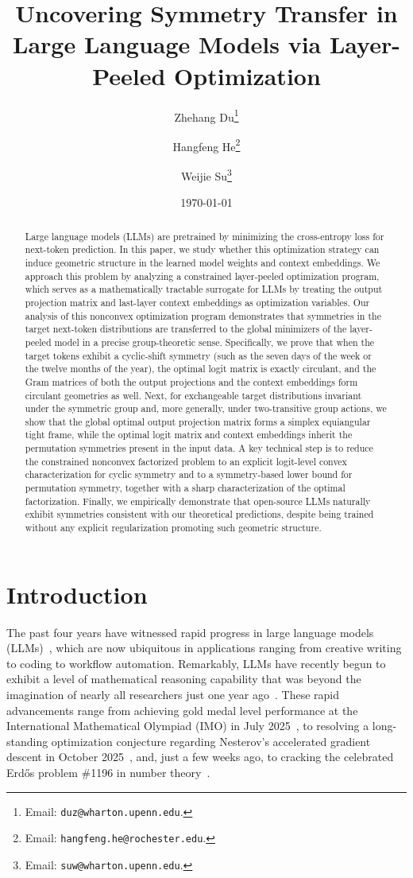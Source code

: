 \documentclass[11pt]{article}
\title{Uncovering Symmetry Transfer in Large Language Models via Layer-Peeled Optimization}
\author[1]{Zhehang Du\thanks{Email: \texttt{duz@wharton.upenn.edu}.}}
\author[2]{Hangfeng He\thanks{Email: \texttt{hangfeng.he@rochester.edu}.}}
\author[1]{Weijie Su\thanks{Email: \texttt{suw@wharton.upenn.edu}.}}
\affil[1]{The Wharton School, University of Pennsylvania}
\affil[2]{University of Rochester}
\date\today
\begin{document}
\maketitle

\begin{abstract}
Large language models (LLMs) are pretrained by minimizing the cross-entropy loss for next-token prediction. In this paper, we study whether this optimization strategy can induce geometric structure in the learned model weights and context embeddings. We approach this problem by analyzing a constrained layer-peeled optimization program, which serves as a mathematically tractable surrogate for LLMs by treating the output projection matrix and last-layer context embeddings as optimization variables. Our analysis of this nonconvex optimization program demonstrates that symmetries in the target next-token distributions are transferred to the global minimizers of the layer-peeled model in a precise group-theoretic sense. Specifically, we prove that when the target tokens exhibit a cyclic-shift symmetry (such as the seven days of the week or the twelve months of the year), the optimal logit matrix is exactly circulant, and the Gram matrices of both the output projections and the context embeddings form circulant geometries as well. Next, for exchangeable target distributions invariant under the symmetric group and, more generally, under two-transitive group actions, we show that the global optimal output projection matrix forms a simplex equiangular tight frame, while the optimal logit matrix and context embeddings inherit the permutation symmetries present in the input data. A key technical step is to reduce the constrained nonconvex factorized problem to an explicit logit-level convex characterization for cyclic symmetry and to a symmetry-based lower bound for permutation symmetry, together with a sharp characterization of the optimal factorization. Finally, we empirically demonstrate that open-source LLMs naturally exhibit symmetries consistent with our theoretical predictions, despite being trained without any explicit regularization promoting such geometric structure.
\end{abstract}

\section{Introduction}

The past four years have witnessed rapid progress in large language models (LLMs)~\citep{brown2020language,achiam2023gpt4}, which are now ubiquitous in applications ranging from creative writing to coding to workflow automation. Remarkably, LLMs have recently begun to exhibit a level of mathematical reasoning capability that was beyond the imagination of nearly all researchers just one year ago~\citep{bubeck2025early}. These rapid advancements range from achieving gold medal level performance at the International Mathematical Olympiad (IMO) in July 2025~\citep{googledeepmind2025imo}, to resolving a long-standing optimization conjecture regarding Nesterov's accelerated gradient descent in October 2025~\citep{jang2025point}, and, just a few weeks ago, to cracking the celebrated Erd\H{o}s problem \#1196 in number theory~\citep{alexeev2026primitive}.
\end{document}
